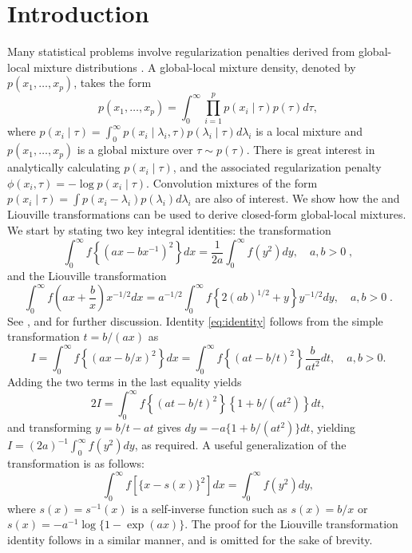 \documentclass[bj]{imsart}
\begin{document}
\section{Introduction}
Many statistical problems involve regularization penalties derived from global-local mixture distributions \citep{polson_data_2011, hans2011comment, bhadra2015horseshoe+}. A global-local mixture density, denoted by $p(x_1, \ldots, x_p)$, takes the form 
\[
p(x_1, \ldots, x_p) = \int_{0}^{\infty}\prod_{i=1}^{p} p(x_i \mid \tau) p(\tau) d\tau, 
\]
where $p(x_i \mid \tau) = \int_{0}^{\infty} p(x_i \mid \lambda_i, \tau) p(\lambda_i \mid \tau) d\lambda_i$ is a local mixture and $p(x_1, \ldots, x_p)$ is a global mixture over $\tau \sim p(\tau)$. There is great interest in analytically calculating $p(x_i \mid \tau)$, and the associated regularization penalty $\phi(x_i, \tau) = -\log p(x_i \mid \tau)$. Convolution mixtures of the form $p(x_i \mid \tau) = \int p(x_i - \lambda_i) p(\lambda_i) d \lambda_i$ are also of interest. We show how the \CS{} and Liouville transformations can be used to derive closed-form global-local mixtures.  We start by stating two key integral identities: the \CS{} transformation 
\begin{equation}
  \int_0^\infty f \left\{ ( a x - b x^{-1} )^2 \right\} d x = \frac{1}{2a} \int_0^\infty f(y^2) d y, \quad a, b >0  \;, \label{eq:identity}
\end{equation}
and the Liouville transformation
\begin{equation}
  \int_{0}^{\infty} f\left(ax + \frac{b}{x} \right) x^{-1/2}dx = a^{-1/2} \int_{0}^{\infty} f\left\{ 2 (ab)^{1/2} + y \right\} y^{-1/2} dy, \quad a, b >0  \;. 
  \label{eq:liouville}
\end{equation}
See \citet{boros2006irresistible}, \citet{baker2008probabilistic} and \citet{jones_generating_2014} for further discussion. Identity \eqref{eq:identity} follows from the simple transformation $t = b/(a x)$ as
\begin{equation*}
  I = \int_{0}^{\infty} f \left\{(ax - b/x)^2 \right\} dx = \int_{0}^{\infty} f \left\{(at - b/t)^2 \right\} \frac{b}{a t^2} dt, \quad a, b >0.
\end{equation*}
Adding the two terms in the last equality yields 
\[
2 I = \int_{0}^{\infty} f \left\{(at - b/t)^2 \right\} \left\{ 1+{b}/({a t^2}) \right\} dt,
\]
\sloppy
and transforming $y = b/t - at$ gives $dy = -a \{1+{b}/({a t^2})\} dt$, yielding $I = (2a)^{-1} \int_{0}^{\infty} f(y^2) dy$, as required. A useful generalization of the \CS{} transformation is as follows: 
\begin{equation}
  \int_0^\infty f\left[ \{x-s(x)\}^2 \right] dx =  \int_0^\infty f( y^2 ) dy, \label{eq:gen}
\end{equation}
where $s(x)=s^{-1}(x)$ is a self-inverse function such as $s(x) = b/x$ or $s(x) = -a^{-1}\log\{1-\exp(a x)\}$. The proof for the Liouville transformation identity follows in a similar manner, and is omitted for the sake of brevity. %
\end{document}
